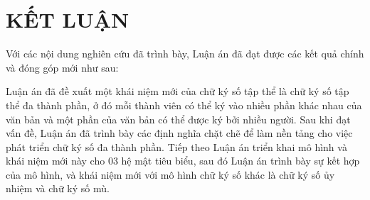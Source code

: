 
\chapter*{KẾT LUẬN}%
Với các nội dung nghiên cứu đã trình bày, Luận án đã đạt được các kết quả chính và đóng góp mới như sau:

Luận án đã đề xuất một khái niệm mới của chữ ký số tập thể là chữ ký số tập thể đa thành phần, ở đó mỗi thành viên có thể ký vào nhiều phần khác nhau của văn bản và một phần của văn bản có thể được ký bởi nhiều người. Sau khi đạt vấn đề, Luận án đã trình bày các định nghĩa chặt chẽ để làm nền tảng cho việc phát triển chữ ký số đa thành phần. Tiếp theo Luận án triển khai mô hình và khái niệm mới này cho 03 hệ mật tiêu biểu, sau đó Luận án trình bày sự kết hợp của mô hình, và khái niệm mới với mô hình chữ ký số khác là chữ ký số ủy nhiệm và chữ ký số mù.


